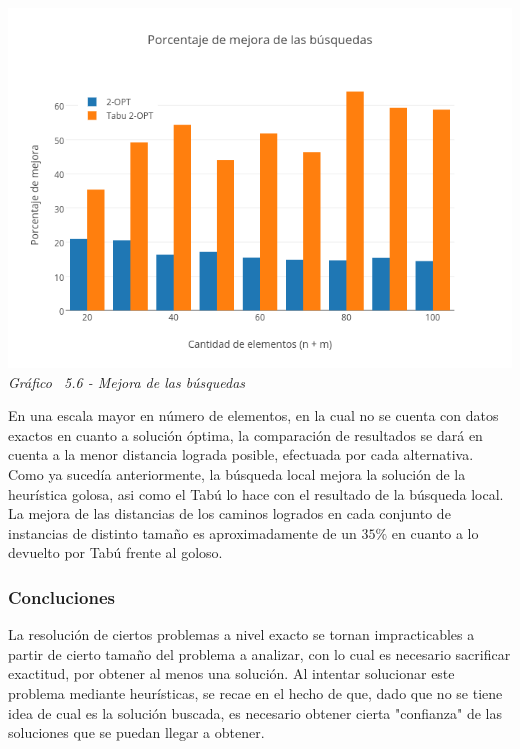     \vspace*{0.3cm} \vspace*{0.3cm}
  \begin{center}
 \includegraphics[scale=0.5]{./EJ5/mejoraGrande.png}\\
 {\textit{Gráfico \ 5.6 - Mejora de las búsquedas}}
  \end{center}
  \vspace*{0.3cm}

En una escala mayor en número de elementos, en la cual no se cuenta con datos exactos en cuanto a solución óptima, la comparación de resultados se dará en cuenta a la menor distancia lograda posible, efectuada por cada alternativa. Como ya sucedía anteriormente, la búsqueda local mejora la solución de la heurística golosa, asi como el Tabú lo hace con el resultado de la búsqueda local. La mejora de las distancias de los caminos logrados en cada conjunto de instancias de distinto tamaño es aproximadamente de un $35\%$ en cuanto a lo devuelto por Tabú frente al goloso.

\subsubsection{Concluciones}

La resolución de ciertos problemas a nivel exacto se tornan impracticables a partir de cierto tamaño del problema a analizar, con lo cual es necesario sacrificar exactitud, por obtener al menos una solución. Al intentar solucionar este problema mediante heurísticas, se recae en el hecho de que, dado que no se tiene idea de cual es la solución buscada, es necesario obtener cierta "confianza" de las soluciones que se puedan llegar a obtener.

